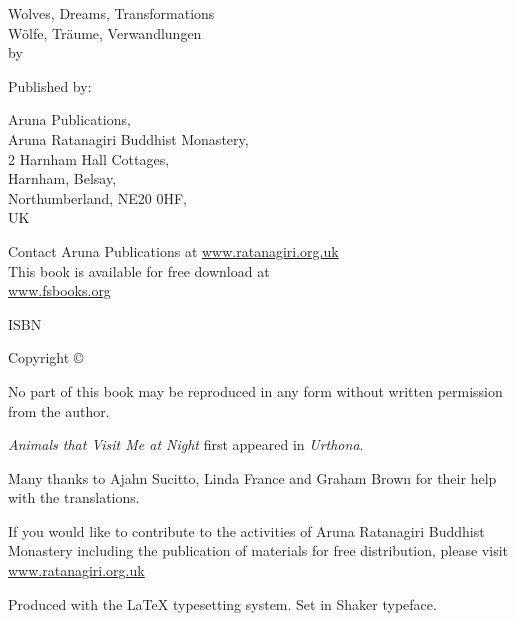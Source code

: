 {\small\setlength{\parskip}{0.8em}\setlength{\parindent}{0em}%
{\raggedright%

Wolves, Dreams, Transformations\\
Wölfe, Träume, Verwandlungen\\
by \theauthor

Published by:

Aruna Publications,\\
Aruna Ratanagiri Buddhist Monastery,\\
2 Harnham Hall Cottages,\\
Harnham, Belsay,\\
Northumberland, NE20 0HF,\\
UK

Contact Aruna Publications at \href{http://ratanagiri.org.uk}{www.ratanagiri.org.uk}\\
This book is available for free download at\\
\href{http://fsbooks.org/}{www.fsbooks.org}

ISBN \theISBN

Copyright \copyright\ \the\year\ \theauthor

No part of this book may be reproduced in any form without written permission from the author.

\vfill

\textit{Animals that Visit Me at Night} first appeared in \textit{Urthona}.

Many thanks to Ajahn Sucitto, Linda France and Graham Brown for their help with the translations.

If you would like to contribute to the activities of Aruna Ratanagiri Buddhist Monastery including the publication of materials for free distribution, please visit \href{http://ratanagiri.org.uk/}{www.ratanagiri.org.uk}

{\footnotesize
Produced with the {\selectfont\LaTeX} typesetting system. Set in Shaker typeface.

\theEditionInfo

}

}}


